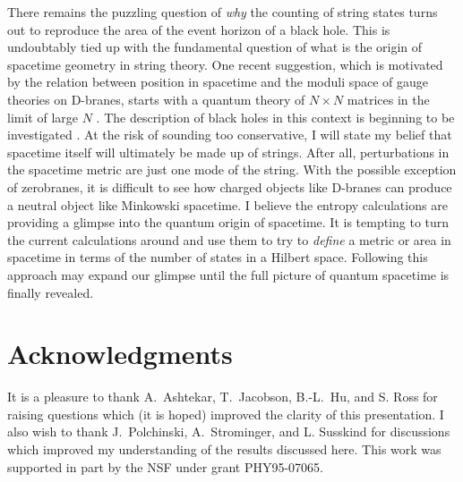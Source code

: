 \documentclass[12pt]{article}
\newcommand{\sect}[1]{\section{#1}\setcounter{equation}{0}}
\begin{document}
There remains the puzzling question of {\it why} the counting of string states
turns out to reproduce the area of the event horizon of a black hole.
This is undoubtably tied up with the fundamental question of
what is the origin of spacetime geometry in string theory. One recent 
suggestion, which is motivated by the relation between position in spacetime
and the moduli space of gauge theories on D-branes, 
starts with a quantum theory of $N\times N$ matrices in the limit of large $N$
\cite{bfss}. The description of black holes in this context is beginning
to be investigated \cite{lima,dvv}. At the risk of sounding too
conservative, I will state my belief that 
spacetime itself will ultimately be made up
of strings. 
After all, perturbations in the spacetime metric are just one
mode of the string. With the possible exception of zerobranes, it is difficult
to see how charged objects like D-branes can produce a neutral object like
Minkowski spacetime.
I believe the entropy calculations are providing a
glimpse into the quantum origin of spacetime. It is tempting to turn
the current calculations around and use them to try to {\it define} a metric or
area in spacetime in terms of the number of states in a Hilbert space.
Following this approach may expand our glimpse 
until
the full picture of quantum spacetime is finally revealed.

\sect{Acknowledgments}

It is a pleasure to thank A.~Ashtekar, T.~Jacobson, B.-L.~Hu, and S. Ross
for raising questions which (it is hoped) improved the clarity of this
presentation.  I also wish to thank J.~Polchinski, A.~Strominger, and 
L. Susskind for
discussions which improved my understanding of the results discussed
here.  This work was
supported in part by the NSF under grant PHY95-07065.
\end{document}
